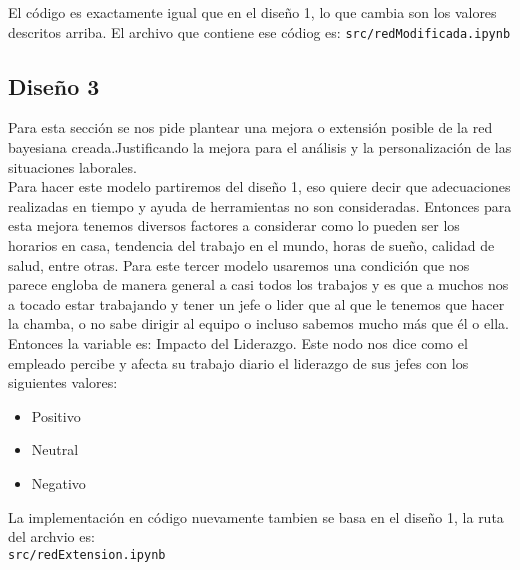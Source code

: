 El código es exactamente igual que en el diseño 1, lo que cambia son los valores descritos arriba. El 
archivo que contiene ese códiog es: \texttt{src/redModificada.ipynb}

\subsection{Diseño 3}

Para esta sección se nos pide plantear una mejora o extensión posible de la red bayesiana creada.Justificando
la mejora para el análisis y la personalización de las situaciones laborales.\\ 

Para hacer este modelo partiremos del diseño 1, eso quiere decir que adecuaciones realizadas en tiempo y 
ayuda de herramientas no son consideradas. Entonces para esta mejora tenemos diversos factores a considerar 
como lo pueden ser los horarios en casa, tendencia del trabajo en el mundo, horas de sueño, calidad de salud, 
entre otras. Para este tercer modelo usaremos una condición que nos parece engloba de manera general a casi 
todos los trabajos y es que a muchos nos a tocado estar trabajando y tener un jefe o lider que al que 
le tenemos que hacer la chamba, o no sabe dirigir al equipo o incluso sabemos mucho más que él o ella.\\ 


Entonces la variable es: Impacto del Liderazgo. Este nodo nos dice como el empleado percibe y afecta 
su trabajo diario el liderazgo de sus jefes con los siguientes valores:
\begin{itemize}
    \item Positivo
    \item Neutral
    \item Negativo
\end{itemize}

La implementación en código nuevamente tambien se basa en el diseño 1, la ruta del archvio es:\\
\texttt{src/redExtension.ipynb}